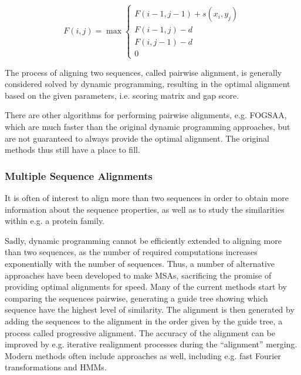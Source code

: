 \documentclass[a4paper, twoside, 12pt, openright]{report}
\begin{document}
\begin{equation}
     F(i,j) = \max 
    \begin{cases}
      F(i-1,j-1) + s(x_i, y_j)\\
      F(i-1,j) - d\\
       F(i,j-1) - d\\
       0
    \end{cases}
    \label{eq:sw_field}
\end{equation}

The process of aligning two sequences, called pairwise alignment, is generally considered solved by dynamic programming\cite{needleman_general_1970, smith_identification_1981}, resulting in the optimal alignment based on the given parameters, i.e. scoring matrix and gap score. 

There are other algorithms for performing pairwise alignments, e.g. FOGSAA\cite{chakraborty_fogsaa:_2013}, which are much faster than the original dynamic programming approaches, but are not guaranteed to always provide the optimal alignment. The original methods thus still have a place to fill.


\subsubsection{Multiple Sequence Alignments}
\label{sec:msa}

It is often of interest to align more than two sequences in order to obtain more information about the sequence properties, as well as to study the similarities within e.g. a protein family.

Sadly, dynamic programming cannot be efficiently extended to aligning more than two sequences, as the number of required computations increases exponentially with the number of sequences. Thus, a number of alternative approaches have been developed to make MSAs, sacrificing the promise of providing optimal alignments for speed. Many of the current methods start by comparing the sequences pairwise, generating a guide tree showing which sequence have the highest level of similarity. The alignment is then generated by adding the sequences to the alignment in the order given by the guide tree, a process called progressive alignment. The accuracy of the alignment can be improved by e.g. iterative realignment processes during the ``alignment'' merging. Modern methods often include approaches as well, including e.g. fast Fourier transformations and HMMs.
\end{document}
